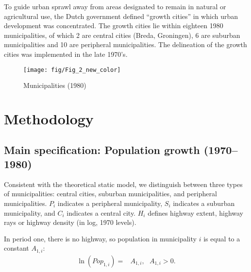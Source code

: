 \documentclass[a4paper,authoryear,review]{elsarticle}  	%
\begin{document}
	To guide urban sprawl away from areas designated to remain in natural or agricultural use, the Dutch government defined “growth cities” in which urban development was concentrated. The growth cities lie within eighteen 1980 municipalities, of which 2 are central cities (Breda, Groningen), 6 are suburban municipalities and 10 are peripheral municipalities. The delineation of the growth cities was implemented in the late 1970’s. 
	
	
	
	\begin{figure}[!hbtp]
		\centering
		\caption{Municipalities (1980)}
		\texttt{[image: fig/Fig\_2\_new\_color]}\label{ch3.fig:2}
	\end{figure}
	

\section{Methodology}
\subsection{Main specification: Population growth (1970--1980)}
	Consistent with the theoretical static model, we distinguish between three types of municipalities: central cities, suburban municipalities, and peripheral municipalities. $P_i$ indicates a peripheral municipality, $S_i$ indicates a suburban municipality, and $C_i$ indicates a central city. $H_i$ defines highway extent, highway rays or highway density (in log, 1970 levels). 
	
	In period one, there is no highway, so population in municipality $i$ is equal to a constant $A_{1,i}$:
	\begin{equation}\label{ch3.eq:1a}
		\begin{split}
			\ln(Pop_{1,i}) =& A_{1,i}, \,\,\,\, A_{1,i} > 0 .
		\end{split}
	\end{equation}
	
\end{document}
